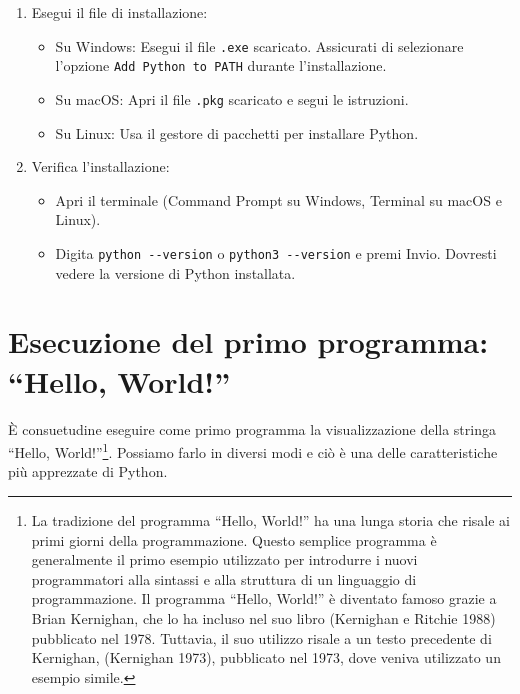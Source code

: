 \documentclass[
  letterpaper,
]{scrbook}
\providecommand{\tightlist}{%
  \setlength{\itemsep}{0pt}\setlength{\parskip}{0pt}}\usepackage{longtable,booktabs,array}
\begin{document}
\begin{enumerate}
\def\labelenumi{\arabic{enumi}.}
\tightlist
\item
  Esegui il file di installazione:

  \begin{itemize}
  \tightlist
  \item
    Su Windows: Esegui il file \texttt{.exe} scaricato. Assicurati di
    selezionare l'opzione \texttt{Add\ Python\ to\ PATH} durante
    l'installazione.
  \item
    Su macOS: Apri il file \texttt{.pkg} scaricato e segui le
    istruzioni.
  \item
    Su Linux: Usa il gestore di pacchetti per installare Python.
  \end{itemize}
\item
  Verifica l'installazione:

  \begin{itemize}
  \tightlist
  \item
    Apri il terminale (Command Prompt su Windows, Terminal su macOS e
    Linux).
  \item
    Digita \texttt{python\ -\/-version} o \texttt{python3\ -\/-version}
    e premi Invio. Dovresti vedere la versione di Python installata.
  \end{itemize}
\end{enumerate}

\section{Esecuzione del primo programma: ``Hello,
World!''}\label{esecuzione-del-primo-programma-hello-world}

È consuetudine eseguire come primo programma la visualizzazione della
stringa ``Hello, World!''\footnote{La tradizione del programma ``Hello,
  World!'' ha una lunga storia che risale ai primi giorni della
  programmazione. Questo semplice programma è generalmente il primo
  esempio utilizzato per introdurre i nuovi programmatori alla sintassi
  e alla struttura di un linguaggio di programmazione. Il programma
  ``Hello, World!'' è diventato famoso grazie a Brian Kernighan, che lo
  ha incluso nel suo libro (Kernighan e Ritchie 1988) pubblicato nel
  1978. Tuttavia, il suo utilizzo risale a un testo precedente di
  Kernighan, (Kernighan 1973), pubblicato nel 1973, dove veniva
  utilizzato un esempio simile.}. Possiamo farlo in diversi modi e ciò è
una delle caratteristiche più apprezzate di Python.
\end{document}
